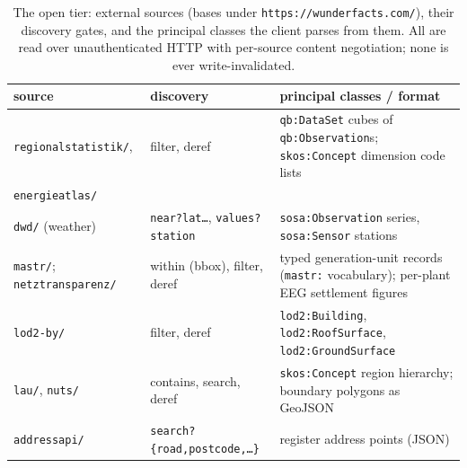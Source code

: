 \documentclass[11pt,a4paper]{article}
\theoremstyle{remark}
\newcommand{\code}[1]{\texttt{#1}}
\begin{document}
\begin{table}[t]
\centering
\small
\setlength{\tabcolsep}{4pt}
\begin{tabular}{@{}llp{6.2cm}@{}}
source & discovery & principal classes / format \\
\hline
\code{regionalstatistik/}, & filter, deref &
  \code{qb:DataSet} cubes of \code{qb:Observation}s; \code{skos:Concept}
  dimension code lists \\
\quad\code{energieatlas/} & & \\
\code{dwd/} (weather) & \code{near?lat\ldots}, \code{values?station} &
  \code{sosa:Observation} series, \code{sosa:Sensor} stations \\
\code{mastr/}; \code{netztransparenz/} & within (bbox), filter, deref &
  typed generation-unit records (\code{mastr:} vocabulary); per-plant EEG
  settlement figures \\
\code{lod2-by/} & filter, deref & \code{lod2:Building},
  \code{lod2:RoofSurface}, \code{lod2:GroundSurface} \\
\code{lau/}, \code{nuts/} & contains, search, deref & \code{skos:Concept}
  region hierarchy; boundary polygons as GeoJSON \\
\code{addressapi/} & \code{search?\{road,postcode,\ldots\}} & register
  address points (JSON) \\
\end{tabular}
\caption{The open tier: external sources (bases under
\code{https://wunderfacts.com/}), their discovery gates, and the principal
classes the client parses from them. All are read over unauthenticated HTTP
with per-source content negotiation; none is ever write-invalidated.}
\label{tab:openclasses}
\end{table}
\end{document}
